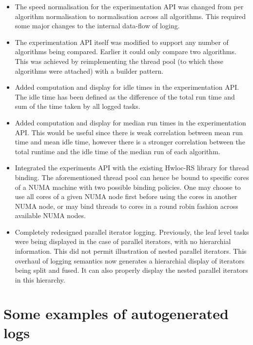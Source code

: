 \begin{itemize}
\item The speed normalisation for the experimentation API was changed from per algorithm normalisation to normalisation across all algorithms. This required some major changes to the internal data-flow of loging.
\item The experimentation API itself was modified to support any number of algorithms being compared. Earlier it could only compare two algorithms. This was achieved by reimplementing the thread pool (to which these algorithms were attached) with a builder pattern.
\item Added computation and display for idle times in the experimentation API. The idle time has been defined as the difference of the total run time and sum of the time taken by all logged tasks.
\item Added computation and display for median run times in the experimentation API. This would be useful since there is weak correlation between mean run time and mean idle time, however there is a stronger correlation between the total runtime and the idle time of the median run of each algorithm.
\item Integrated the experiments API with the existing Hwloc-RS library for thread binding. The aforementioned thread pool can hence be bound to specific cores of a NUMA machine with two possible binding policies. One may choose to use all cores of a given NUMA node first before using the cores in another NUMA node, or may bind threads to cores in a round robin fashion across available NUMA nodes.
\item Completely redesigned parallel iterator logging. Previously, the leaf level tasks were being displayed in the case of parallel iterators, with no hierarchial information. This did not permit illustration of nested parallel iterators. This overhaul of logging semantics now generates a hierarchial display of iterators being split and fused. It can also properly display the nested parallel iterators in this hierarchy.
\end{itemize}

\clearpage
\section{Some examples of autogenerated logs}

